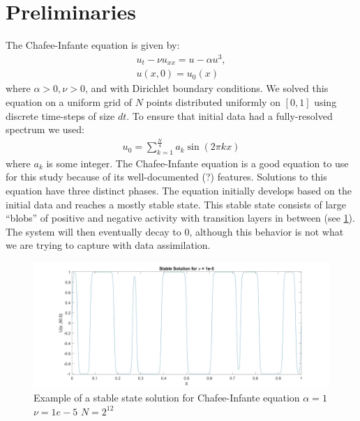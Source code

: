 \documentclass[12pt]{amsart}
\theoremstyle{plain}
\theoremstyle{definition}
\theoremstyle{remark}
\numberwithin{equation}{section} %
\numberwithin{figure}{section}   %
\begin{document}
\section{Preliminaries}\label{secPre}
\noindent
The Chafee-Infante equation is given by: 
\begin{align*}
u_t - \nu u_{xx} = u - \alpha u^3,\\
u(x,0) = u_0(x)
\end{align*}
where $\alpha>0, \nu>0$, and with Dirichlet boundary conditions. We solved this equation on a uniform grid of $N$ points distributed uniformly on $\left[0,1\right]$ using discrete time-steps of size $dt$. To ensure that initial data had a fully-resolved spectrum we used:
\begin{align*}
u_0 = \sum_{k=1}^{\frac{N}{4}}a_k\sin(2\pi kx)
\end{align*}
where $a_k$ is some integer. The Chafee-Infante equation is a good equation to use for this study because of its well-documented (?) features. Solutions to this equation have three distinct phases. The equation initially develops based on the initial data and reaches a mostly stable state. This stable state consists of large ``blobs'' of positive and negative activity with transition layers in between (see \cref{fig:example}). The system will then eventually decay to 0, although this behavior is not what we are trying to capture with data assimilation.
\begin{figure}
	\centering
	\includegraphics[scale=0.15]{Example.jpg}
	\caption{Example of a stable state solution for Chafee-Infante equation $\alpha = 1$ $\nu=1e-5$  $N = 2^{12}$}
	\label{fig:example}
\end{figure}
\end{document}
